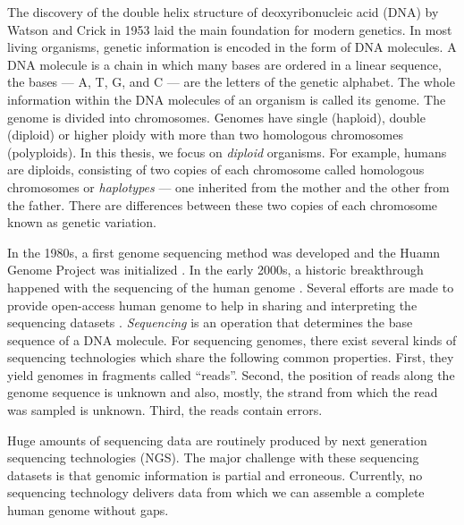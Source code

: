 The discovery of the double helix structure of deoxyribonucleic acid (DNA) by Watson and Crick in 1953 laid the main foundation for modern genetics.
In most living organisms, genetic information is encoded in the form of DNA molecules.
A DNA molecule is a chain in which many bases are ordered in a linear sequence, the bases --- A, T, G, and C --- are the letters of the genetic alphabet.
The whole information within the DNA molecules of an organism is called its genome. The genome is divided into chromosomes.
Genomes have single (haploid), double (diploid) or higher ploidy with more than two homologous chromosomes (polyploids). 
In this thesis, we focus on \textit{diploid} organisms. For example, humans are diploids, consisting of two copies of each chromosome called homologous chromosomes or \textit{haplotypes} --- one inherited from the mother and the other from the father.
There are differences between these two copies of each chromosome known as genetic variation. 

In the 1980s, a first genome sequencing method was developed \citep{church1984genomic} and the Huamn Genome Project was initialized \citep{cook1989alta}.
In the early 2000s, a historic breakthrough happened with the sequencing of the human genome \citep{venter2001sequence, collins2003human}.
Several efforts are made to provide open-access human genome to help in sharing and interpreting the sequencing datasets \citep{church2005personal}.
\textit{Sequencing} is an operation that determines the base sequence of a DNA molecule.
For sequencing genomes, there exist several kinds of sequencing technologies which share the following common properties.
First, they yield genomes in fragments called ``reads''. Second, the position of reads along the genome sequence is unknown and also, mostly, the strand from which the read was sampled is unknown.
Third, the reads contain errors.

Huge amounts of sequencing data are routinely produced by next generation sequencing technologies (NGS). 
The major challenge with these sequencing datasets is that genomic information is partial and erroneous. 
Currently, no sequencing technology delivers data from which we can assemble a complete human genome without gaps.

